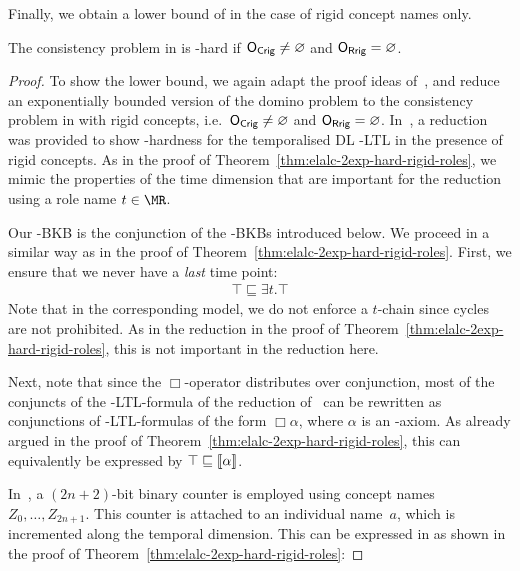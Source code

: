 \noindent
Finally, we obtain a lower bound of \NExpTime in the case of rigid concept names
only.

\begin{theorem}\label{thm:elalc-nexp-hard-rigid-concepts}
  The consistency problem in \ELALC is \NExpTime-hard if $\mathsf{O_{Crig}} \neq \varnothing$ and
  $\mathsf{O_{Rrig}} = \varnothing$.
\end{theorem}

\begin{proof}
  To show the lower bound, we again adapt the proof ideas of~\cite{BaGL-KR08,BaGL-ToCL12}, and
  reduce an exponentially bounded version of the domino problem to the consistency problem in \ELALC
  with rigid concepts, i.e.~$\mathsf{O_{Crig}}\ne\varnothing$ and $\mathsf{O_{Rrig}}=\varnothing$.
  In~\cite{BaGL-KR08,BaGL-ToCL12}, a reduction was provided to show \NExpTime-hardness for the
  temporalised DL \ALC-LTL in the presence of rigid concepts.
  As in the proof of Theorem~\ref{thm:elalc-2exp-hard-rigid-roles}, we mimic the properties of the
  time dimension that are important for the reduction using a role name $t\in\MR$.
  
  \noindent
  Our \ELALC-BKB is the conjunction of the \ELALC-BKBs introduced below.  We proceed in a similar
  way as in the proof of Theorem~\ref{thm:elalc-2exp-hard-rigid-roles}.
  First, we ensure that we never have a \emph{last} time point:
  \begin{gather*}
    \top\sqsubseteq\exists t.\top
  \end{gather*}
  Note that in the corresponding model, we do not enforce a $t$-chain since cycles are not
  prohibited.  As in the reduction in the proof of Theorem~\ref{thm:elalc-2exp-hard-rigid-roles},
  this is not important in the reduction here.

  Next, note that since the $\Box$-operator distributes over conjunction, most of the conjuncts of
  the \ALC-LTL-formula of the reduction of~\cite{BaGL-KR08,BaGL-ToCL12} can be rewritten as
  conjunctions of \ALC-LTL-formulas of the form $\Box\alpha$, where $\alpha$ is an \ALC-axiom.  As
  already argued in the proof of Theorem~\ref{thm:elalc-2exp-hard-rigid-roles}, this can equivalently be expressed
  by $\top\sqsubseteq\llbracket\alpha\rrbracket$.

  In~\cite{BaGL-KR08,BaGL-ToCL12}, a $(2n+2)$-bit binary counter is employed using concept names
  $Z_0,\dots,Z_{2n+1}$.  This counter is attached to an individual name~$a$, which is incremented
  along the temporal dimension.  This can be expressed in \ELALC as shown in the proof of
  Theorem~\ref{thm:elalc-2exp-hard-rigid-roles}:


\end{proof}
